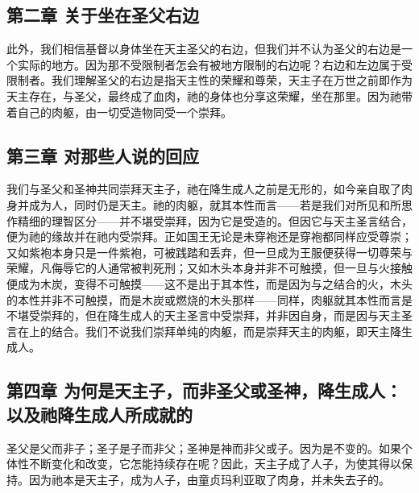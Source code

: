 \subsection{第二章 关于坐在圣父右边}

此外，我们相信基督以身体坐在天主圣父的右边，但我们并不认为圣父的右边是一个实际的地方。因为那不受限制者怎会有被地方限制的右边呢？右边和左边属于受限制者。我们理解圣父的右边是指天主性的荣耀和尊荣，天主子在万世之前即作为天主存在，与圣父，最终成了血肉，祂的身体也分享这荣耀，坐在那里。因为祂带着自己的肉躯，由一切受造物同受一个崇拜。\par


\subsection{第三章 对那些人说的回应}

我们与圣父和圣神共同崇拜天主子，祂在降生成人之前是无形的，如今亲自取了肉身并成为人，同时仍是天主。祂的肉躯，就其本性而言——若是我们对所见和所思作精细的理智区分——并不堪受崇拜，因为它是受造的。但因它与天主圣言结合，便为祂的缘故并在祂内受崇拜。正如国王无论是未穿袍还是穿袍都同样应受尊崇；又如紫袍本身只是一件紫袍，可被践踏和丢弃，但一旦成为王服便获得一切尊荣与荣耀，凡侮辱它的人通常被判死刑；又如木头本身并非不可触摸，但一旦与火接触便成为木炭，变得不可触摸——这不是出于其本性，而是因为与之结合的火，木头的本性并非不可触摸，而是木炭或燃烧的木头那样——同样，肉躯就其本性而言是不堪受崇拜的，但在降生成人的天主圣言中受崇拜，并非因自身，而是因与天主圣言在上的结合。我们不说我们崇拜单纯的肉躯，而是崇拜天主的肉躯，即天主降生成人。\par


\subsection{第四章 为何是天主子，而非圣父或圣神，降生成人：以及祂降生成人所成就的}

圣父是父而非子；圣子是子而非父；圣神是神而非父或子。因为是不变的。如果个体性不断变化和改变，它怎能持续存在呢？因此，天主子成了人子，为使其得以保持。因为祂本是天主子，成为人子，由童贞玛利亚取了肉身，并未失去子的。\par

